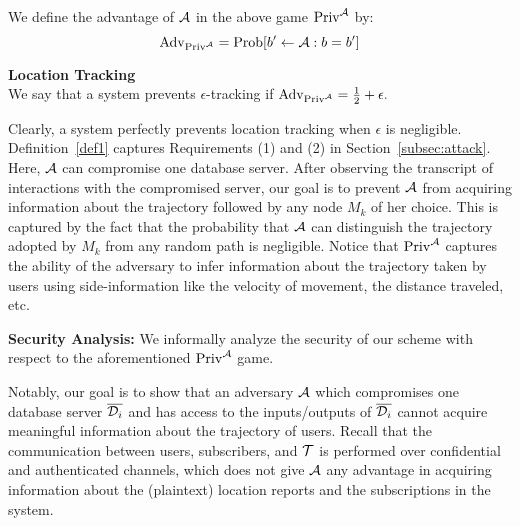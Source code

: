 \documentclass{llncs}
\begin{document}
We define the advantage of ${\cal A}$ in the above game $\mathrm{Priv}^{{\cal A}}$ by:
\begin{equation*}
\mathrm{Adv}_{\mathrm{Priv}^{{\cal A}}}=\mathrm{Prob}[b' \leftarrow {{\cal A}} : b=b']
\end{equation*}

\begin{definition}\label{def1}
\textbf{Location Tracking}\\
We say that a system prevents $\epsilon$-tracking if $\mathrm{Adv}_{\mathrm{Priv}^{{\cal A}}} = \frac{1}{2} + \epsilon.$
\end{definition}

Clearly, a system perfectly prevents location tracking when $\epsilon$ is negligible. Definition~\ref{def1} captures Requirements (1) and (2) in Section~\ref{subsec:attack}. Here, ${\cal A}$ can compromise
one database server. After observing the
transcript of interactions with the compromised server, our goal is to prevent ${\cal A}$ from acquiring information about the trajectory followed by any node $M_k$ of her choice.
This is captured by the fact that the probability that ${\cal A}$ can distinguish the trajectory adopted by $M_k$ from any random path is negligible. Notice that $\mathrm{Priv}^{\cal A}$ captures
the ability of the adversary to infer information about the trajectory taken by users using side-information like the velocity of movement, the distance traveled, etc.



\vspace{1 em} \noindent \textbf{Security Analysis: }We informally analyze the security of our scheme with respect to the aforementioned $\mathrm{Priv}^{\cal A}$ game.

Notably, our goal is to show that an adversary $\cal A$ which compromises one database server $\overline{{\cal D}_i}$ and has access to the inputs/outputs of $\overline{{\cal D}_i}$ cannot acquire meaningful information
about the trajectory of users. Recall that the communication between users, subscribers, and $\cal T$ is performed over confidential and authenticated channels, which does not
give $\cal A$ any advantage in acquiring information about the (plaintext) location reports and the subscriptions in the system.
\end{document}
